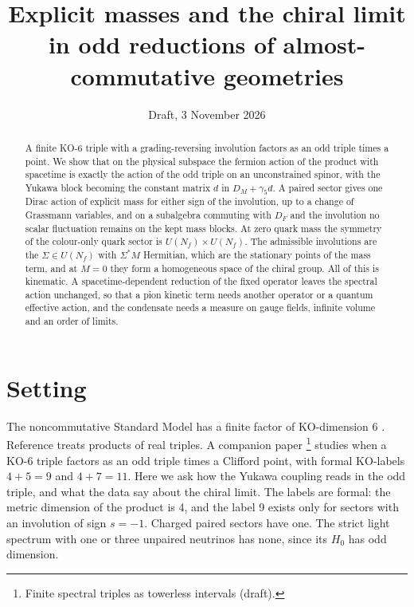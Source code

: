 \documentclass[aps,prd,reprint,onecolumn,nofootinbib,amsmath,amssymb,floatfix]{revtex4-2}
\theoremstyle{plain}
\begin{document}
\title{Explicit masses and the chiral limit in odd reductions of almost-commutative geometries}
\date{Draft, 3 November 2026}

\begin{abstract}
A finite KO-6 triple with a grading-reversing involution factors as an odd triple times a point. We show that on the physical subspace the fermion action of the product with spacetime is exactly the action of the odd triple on an unconstrained spinor, with the Yukawa block becoming the constant matrix $d$ in $D_M+\gamma_5d$. A paired sector gives one Dirac action of explicit mass for either sign of the involution, up to a change of Grassmann variables, and on a subalgebra commuting with $D_F$ and the involution no scalar fluctuation remains on the kept mass blocks. At zero quark mass the symmetry of the colour-only quark sector is $U(N_f)\times U(N_f)$. The admissible involutions are the $\Sigma\in U(N_f)$ with $\Sigma^*M$ Hermitian, which are the stationary points of the mass term, and at $M=0$ they form a homogeneous space of the chiral group. All of this is kinematic. A spacetime-dependent reduction of the fixed operator leaves the spectral action unchanged, so that a pion kinetic term needs another operator or a quantum effective action, and the condensate needs a measure on gauge fields, infinite volume and an order of limits.
\end{abstract}

\maketitle

\section{Setting}

The noncommutative Standard Model has a finite factor of KO-dimension 6 \cite{Connes2006,Barrett2007,CCM2007}. Reference \cite{DD2011} treats products of real triples. A companion paper \footnote{Finite spectral triples as towerless intervals (draft).} studies when a KO-6 triple factors as an odd triple times a Clifford point, with formal KO-labels $4+5=9$ and $4+7=11$. Here we ask how the Yukawa coupling reads in the odd triple, and what the data say about the chiral limit. The labels are formal: the metric dimension of the product is 4, and the label 9 exists only for sectors with an involution of sign $s=-1$. Charged paired sectors have one. The strict light spectrum with one or three unpaired neutrinos has none, since its $H_0$ has odd dimension.
\end{document}
